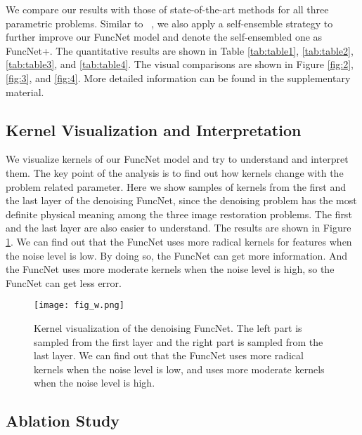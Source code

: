 \documentclass{article}
\begin{document}
We compare our results with those of state-of-the-art methods for all three parametric problems. Similar to ~\cite{lim2017enhanced}, we also apply a self-ensemble strategy to further improve our FuncNet model and denote the self-ensembled one as FuncNet+. The quantitative results are shown in Table \ref{tab:table1}, \ref{tab:table2}, \ref{tab:table3}, and \ref{tab:table4}. The visual comparisons are shown in Figure \ref{fig:2}, \ref{fig:3}, and \ref{fig:4}. More detailed information can be found in the supplementary material.

\subsection{Kernel Visualization and Interpretation}

We visualize kernels of our FuncNet model and try to understand and interpret them. The key point of the analysis is to find out how kernels change with the problem related parameter. Here we show samples of kernels from the first and the last layer of the denoising FuncNet, since the denoising problem has the most definite physical meaning among the three image restoration problems. The first and the last layer are also easier to understand. The results are shown in Figure \ref{fig:w}. We can find out that the FuncNet uses more radical kernels for features when the noise level is low. By doing so, the FuncNet can get more information. And the FuncNet uses more moderate kernels when the noise level is high, so the FuncNet can get less error.

\begin{figure}
\begin{center}
\texttt{[image: fig\_w.png]}
\end{center}
   \caption{Kernel visualization of the denoising FuncNet. The left part is sampled from the first layer and the right part is sampled from the last layer. We can find out that the FuncNet uses more radical kernels when the noise level is low, and uses more moderate kernels when the noise level is high.
}
\label{fig:w}
\end{figure}

\subsection{Ablation Study}
\end{document}
